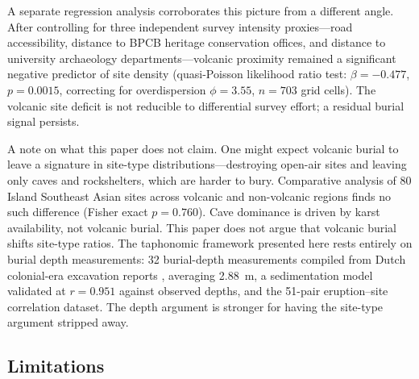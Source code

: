 \documentclass[egqsj, manuscript]{copernicus}
\begin{document}
A separate regression analysis corroborates this picture from a different angle. After controlling for three independent survey intensity proxies---road accessibility, distance to BPCB heritage conservation offices, and distance to university archaeology departments---volcanic proximity remained a significant negative predictor of site density (quasi-Poisson likelihood ratio test: $\beta = -0.477$, $p = 0.0015$, correcting for overdispersion $\phi = 3.55$, $n = 703$ grid cells). The volcanic site deficit is not reducible to differential survey effort; a residual burial signal persists.

A note on what this paper does not claim. One might expect volcanic burial to leave a signature in site-type distributions---destroying open-air sites and leaving only caves and rockshelters, which are harder to bury. Comparative analysis of 80 Island Southeast Asian sites across volcanic and non-volcanic regions finds no such difference (Fisher exact $p = 0.760$). Cave dominance is driven by karst availability, not volcanic burial. This paper does not argue that volcanic burial shifts site-type ratios. The taphonomic framework presented here rests entirely on burial depth measurements: 32 burial-depth measurements compiled from Dutch colonial-era excavation reports \citep{ov1925}, averaging 2.88~m, a sedimentation model validated at $r = 0.951$ against observed depths, and the 51-pair eruption--site correlation dataset. The depth argument is stronger for having the site-type argument stripped away.

\subsection{Limitations}
\end{document}
